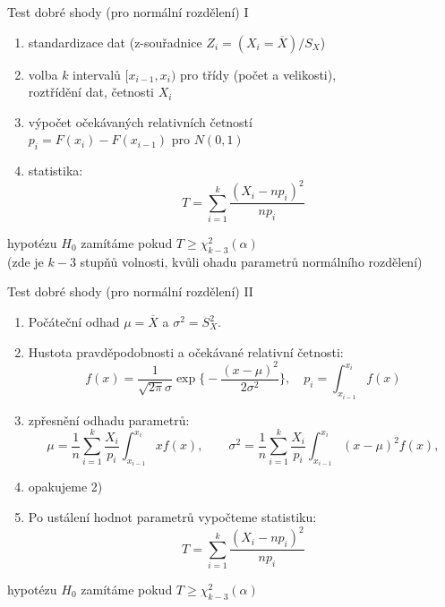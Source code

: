 \documentclass[smaller]{beamer}
\def\ol#1{\overline{#1}}
\begin{document}
\begin{frame}{Test dobré shody (pro normální rozdělení) I} 
\begin{enumerate}
 \item standardizace dat (z-souřadnice $Z_i = (X_i = \ol{X}) / S_X $)
 \item volba $k$ intervalů $[x_{i-1}, x_i)$ pro třídy (počet a velikosti),\\
 roztřídění dat, četnosti $X_i$
 \item výpočet očekávaných relativních četností\\
 $p_i = F(x_{i}) - F(x_{i-1})$ pro $N(0,1)$
 \item statistika:
\[
 T=\sum_{i=1}^k \frac{ (X_i - np_i)^2}{np_i} 
\]
\end{enumerate}
hypotézu $H_0$ zamítáme pokud $T \ge \chi^2_{k-3} (\alpha)$\\
 (zde je $k-3$ stupňů volnosti, kvůli ohadu parametrů normálního rozdělení)
\end{frame}

\begin{frame}{Test dobré shody (pro normální rozdělení) II}
\begin{enumerate}
 \item Počáteční odhad $\mu = \ol{X}$ a $\sigma^2 = S_X^2$.
 \item Hustota pravděpodobnosti a očekávané relativní četnosti:
\[
 f(x)=\frac{1}{\sqrt{2\pi}\sigma} \exp\Big\{-\frac{(x-\mu)^2}{2\sigma^2}\Big\},\quad p_i = \int_{x_{i-1}}^{x_i} f(x)
\]
  \item zpřesnění odhadu parametrů:
\[
 \mu = \frac{1}{n}\sum_{i=1}^{k} \frac{X_i}{p_i} \int_{x_{i-1}}^{x_i} xf(x),
 \qquad
 \sigma^2 = \frac{1}{n}\sum_{i=1}^{k} \frac{X_i}{p_i} \int_{x_{i-1}}^{x_i} (x - \mu)^2 f(x),
\]
\item opakujeme 2)
\item Po ustálení hodnot parametrů vypočteme statistiku:
\[
 T=\sum_{i=1}^k \frac{ (X_i - np_i)^2}{np_i} 
\]
\end{enumerate}
hypotézu $H_0$ zamítáme pokud $T \ge \chi^2_{k-3} (\alpha)$
\end{frame}
\end{document}
